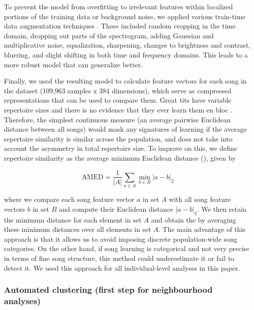 To prevent the model from overfitting to irrelevant features within localized portions of the training data or background noise, we applied various train-time data augmentation techniques \autocite{mumuni2022,perez2017,shorten2019}. These included random cropping in the time domain, dropping out parts of the spectrogram, adding Gaussian and multiplicative noise, equalization, sharpening, changes to brightness and contrast, blurring, and slight shifting in both time and frequency domains. This leads to a more robust model that can generalize better.

Finally, we used the resulting model to calculate feature vectors for each song in the dataset (109,963 samples x 384 dimensions), which serve as compressed representations that can be used to compare them. Great tits have variable repertoire sizes and there is no evidence that they ever learn them en bloc \autocite{mcgregor1982b, rivera-gutierrez2010a}. Therefore, the simplest continuous measure (an average pairwise Euclidean distance between all songs) would mask any signatures of learning if the average repertoire similarity is similar across the population, and does not take into account the asymmetry in total repertoire size. To improve on this, we define repertoire similarity as the average minimum Euclidean distance (), given by

\begin{equation} 
\label{eq1}
\text{AMED} = \frac{1}{|A|} \sum_{a \in A} \min_{b \in B} \left| a - b \right|_2
\end{equation}

where we compare each song feature vector $a$ in set $A$ with all song feature vectors $b$ in set $B$ and compute their Euclidean distance $\left| a - b \right|_2$. We then retain the minimum distance for each element in set $A$ and obtain the  by averaging these minimum distances over all elements in set $A$.
The main advantage of this approach is that it allows us to avoid imposing discrete population-wide song categories. On the other hand, if song learning is categorical and not very precise in terms of fine song structure, this method could underestimate it or fail to detect it. We used this approach for all individual-level analyses in this paper. 

\subsubsection{Automated clustering (first step for neighbourhood analyses)}

